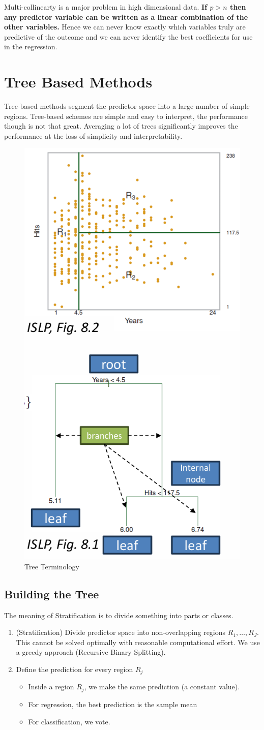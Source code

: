 \documentclass[../Main.tex]{subfiles}
\begin{document}
Multi-collinearty is a major problem 
in high dimensional data.
\textbf{If \(p>n\) then any predictor variable can be 
written as a linear combination of the other 
variables.}
Hence we can never know exactly which 
variables truly are predictive of the 
outcome and we can never identify the 
best coefficients for use in the regression.


\newpage
\section{Tree Based Methods}
Tree-based methods segment the predictor space into a large number of simple regions.
Tree-based schemes are simple and easy to interpret, the performance though is not that great.
Averaging a lot of trees significantly improves the performance at the loss of simplicity and interpretability.

\begin{figure}[H]
    \centering
    \includegraphics[width=0.35\linewidth]{Images/tree-based-methods.png}
    \caption{Tree Terminology}
\end{figure}

\subsection{Building the Tree}
The meaning of Stratification is to divide something into parts or classes.
\begin{enumerate}
    \item (Stratification) Divide predictor space into non-overlapping regions \(R_1,\dots,R_J\).
    This cannot be solved optimally with reasonable computational effort. We use a greedy approach
    (Recursive Binary Splitting).
    \item Define the prediction for every region \(R_j\)
    \begin{itemize}
        \item Inside a region \(R_j\), we make the same prediction (a constant value).
        \item For regression, the best prediction is the 
        sample mean
        \item For classification, we vote.
    \end{itemize}
\end{enumerate}
\end{document}

